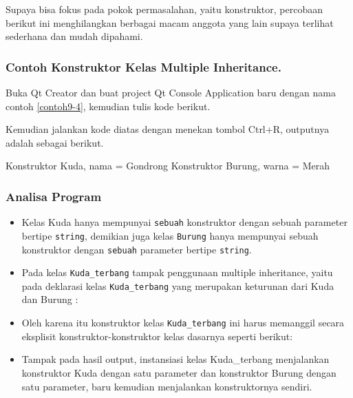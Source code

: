Supaya bisa fokus pada pokok permasalahan, yaitu konstruktor, percobaan
berikut ini menghilangkan berbagai macam anggota yang lain supaya
terlihat sederhana dan mudah dipahami.

\subsubsection*{Contoh  Konstruktor Kelas Multiple Inheritance.}

Buka Qt Creator dan buat project Qt Console Application baru dengan nama
contoh \ref{contoh9-4}, kemudian tulis kode berikut.




Kemudian jalankan kode diatas dengan menekan tombol Ctrl+R, outputnya
adalah sebagai berikut.

\begin{lcverbatim}
Konstruktor Kuda, nama = Gondrong
Konstruktor Burung, warna = Merah
\end{lcverbatim}

\subsubsection*{Analisa Program}

\begin{itemize}
\item
  Kelas Kuda hanya mempunyai \texttt{sebuah} konstruktor dengan sebuah
  parameter bertipe \texttt{string}, demikian juga kelas \texttt{Burung}
  hanya mempunyai sebuah konstruktor dengan \texttt{sebuah} parameter
  bertipe \texttt{string}.
\item
  Pada kelas \texttt{Kuda\_terbang} tampak penggunaan multiple
  inheritance, yaitu pada deklarasi kelas \texttt{Kuda\_terbang} yang
  merupakan keturunan dari Kuda dan Burung :


\item
  Oleh karena itu konstruktor kelas \texttt{Kuda\_terbang} ini harus
  memanggil secara eksplisit konstruktor-konstruktor kelas dasarnya
  seperti berikut:


\item
  Tampak pada hasil output, instansiasi kelas Kuda\_terbang menjalankan
  konstruktor Kuda dengan satu parameter dan konstruktor Burung dengan
  satu parameter, baru kemudian menjalankan konstruktornya sendiri.
\end{itemize}

